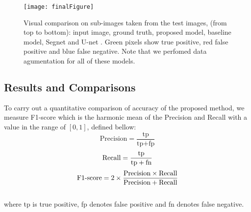 \documentclass[10pt,twocolumn]{article}
\begin{document}
\begin{figure*}[h]
\centering
\texttt{[image: finalFigure]}
\caption{Visual comparison on sub-images taken from the test images, (from top to bottom): input image, ground truth, proposed model, baseline model, Segnet \cite{r8} and U-net \cite{r7}. Green pixels show true positive, red false positive and blue false negative. Note that we perfomed data agumentation for all of these models.
} \label{f5}
\end{figure*}

\subsection{Results and Comparisons}\label{s44}
To carry out a quantitative comparison of accuracy of the proposed method, we measure F1-score which is the harmonic mean of the Precision and Recall \cite{r20} with a value in the range of $[0,1]$, defined bellow:
\\
\begin{equation}
 \text{Precision}=\frac{\text{tp}}{\text{tp}+\text{fp}}
\end{equation}
\begin{equation}
 \textnormal{Recall}=\frac{\text{tp}}{\text{tp}+\text{fn}}
\end{equation}
\begin{equation}
  \text{F1\text{-}score}=2\times\frac{\text{Precision}\times \textnormal{Recall}}{\text{Precision}+\textnormal{Recall}}
\end{equation}
\\
where tp is true positive, fp denotes false positive and fn denotes false negative.
\end{document}
